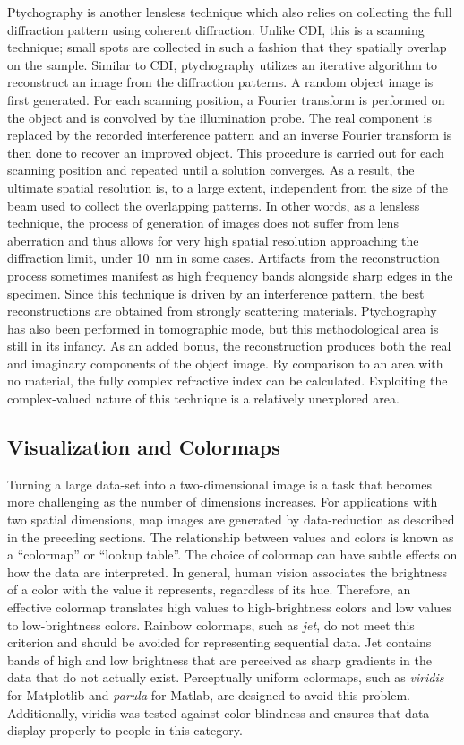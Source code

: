 \documentclass[journal=cmatex,manuscript=perspective]{achemso}
\begin{document}
Ptychography is another lensless technique which also relies on
collecting the full diffraction pattern using coherent
diffraction. Unlike CDI, this is a scanning technique; small spots are
collected in such a fashion that they spatially overlap on the
sample. Similar to CDI, ptychography utilizes an iterative algorithm
to reconstruct an image from the diffraction patterns. A random object
image is first generated. For each scanning position, a Fourier
transform is performed on the object and is convolved by the
illumination probe. The real component is replaced by the recorded
interference pattern and an inverse Fourier transform is then done to
recover an improved object. This procedure is carried out for each
scanning position and repeated until a solution converges. As a
result, the ultimate spatial resolution is, to a large extent,
independent from the size of the beam used to collect the overlapping
patterns. In other words, as a lensless technique, the process of
generation of images does not suffer from lens aberration and thus
allows for very high spatial resolution approaching the diffraction
limit, under \SI{10}{nm} in some cases. Artifacts from the
reconstruction process sometimes manifest as high frequency bands
alongside sharp edges in the specimen. Since this technique is driven
by an interference pattern, the best reconstructions are obtained from
strongly scattering materials. Ptychography has also been performed in
tomographic mode\cite{venkatakrishnan2016}, but this methodological
area is still in its infancy. As an added bonus, the reconstruction
produces both the real and imaginary components of the object
image. By comparison to an area with no material, the fully complex
refractive index can be calculated. Exploiting the complex-valued
nature of this technique is a relatively unexplored area.

\subsection{Visualization and Colormaps}

Turning a large data-set into a two-dimensional image is a task that
becomes more challenging as the number of dimensions increases. For
applications with two spatial dimensions, map images are generated by
data-reduction as described in the preceding sections. The
relationship between values and colors is known as a ``colormap'' or
``lookup table''. The choice of colormap can have subtle effects on
how the data are interpreted. In general, human vision associates the
brightness of a color with the value it represents, regardless of its
hue. Therefore, an effective colormap translates high values to
high-brightness colors and low values to low-brightness
colors. Rainbow colormaps, such as \emph{jet}, do not meet this
criterion and should be avoided for representing sequential data. Jet
contains bands of high and low brightness that are perceived as sharp
gradients in the data that do not actually exist. Perceptually uniform
colormaps, such as \emph{viridis} for Matplotlib and \emph{parula} for
Matlab, are designed to avoid this problem. Additionally, viridis was
tested against color blindness and ensures that data display properly
to people in this category.
\end{document}
